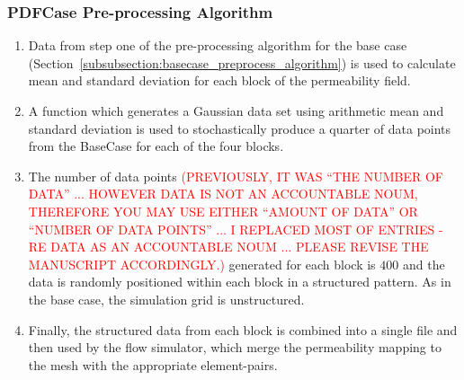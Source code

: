 \documentclass[preprint,12pt]{elsarticle}
\newcommand{\red}{\textcolor{red}}
\begin{document}
\subsubsection{PDFCase Pre-processing Algorithm}\label{subsubsection:pdfcase_preprocess_algorithm}
\begin{enumerate}[1.]
  \item Data from step one of the pre-processing algorithm for the base case (Section~\ref{subsubsection:basecase_preprocess_algorithm}) is used to calculate mean and standard deviation for each block of the permeability field.
  \item A function which generates a Gaussian data set using arithmetic mean and standard deviation is used to stochastically produce a quarter of data points from the BaseCase for each of the four blocks.
  \item The number of data points \red{(PREVIOUSLY, IT WAS ``THE NUMBER OF DATA'' ... HOWEVER DATA IS NOT AN ACCOUNTABLE NOUM, THEREFORE YOU MAY USE EITHER ``AMOUNT OF DATA'' OR ``NUMBER OF DATA POINTS'' ... I REPLACED MOST OF ENTRIES -RE DATA AS AN ACCOUNTABLE NOUM ... PLEASE REVISE THE MANUSCRIPT ACCORDINGLY.)} generated for each block is $400$ and the data is randomly positioned within each block in a structured pattern. As in the base case, the simulation grid is unstructured.
  \item Finally, the structured data from each block is combined into a single file and then used by the flow simulator, which merge the permeability mapping to the mesh with the appropriate element-pairs.
\end{enumerate}
\end{document}
